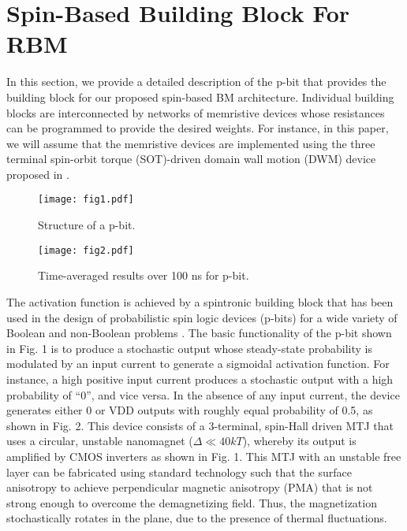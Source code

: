 \section{Spin-Based Building Block For RBM}
In this section, we provide a detailed description of the p-bit that provides the building block for our proposed spin-based BM architecture. Individual building blocks are interconnected by networks of memristive devices whose resistances can be programmed to provide the desired weights. For instance, in this paper, we will assume that the memristive devices are implemented using the three terminal spin-orbit torque (SOT)-driven domain wall motion (DWM) device proposed in \cite{Sengupta2016hybrid}.

\begin{figure}
\texttt{[image: fig1.pdf]}
\caption{Structure of a p-bit.}
\end{figure}

\begin{figure}
\texttt{[image: fig2.pdf]}
\caption{Time-averaged results over 100 ns for p-bit.}
\end{figure}

The activation function is achieved by a spintronic building block that has been used in the design of probabilistic spin logic devices (p-bits) for a wide variety of Boolean and non-Boolean problems \cite{Camsari2017,Faria2017,sutton2017,behin2016}. The basic functionality of the p-bit shown in Fig. 1 \cite{Camsari2017} is to produce a stochastic output whose steady-state probability is modulated by an input current to generate a sigmoidal activation function. For instance, a high positive input current produces a stochastic output with a high probability of ``0'', and vice versa. In the absence of any input current, the device generates either 0 or VDD outputs with roughly equal probability of 0.5, as shown in Fig. 2. This device consists of a 3-terminal, spin-Hall driven MTJ \cite{Liu2012} that uses a circular, unstable nanomagnet ($\Delta \ll 40kT$), whereby its output is amplified by CMOS inverters as shown in Fig. 1. This MTJ with an unstable free layer can be fabricated using standard technology such that the surface anisotropy to achieve perpendicular magnetic anisotropy (PMA) that is not strong enough to overcome the demagnetizing field. Thus, the magnetization stochastically rotates in the plane, due to the presence of thermal fluctuations. 
 
